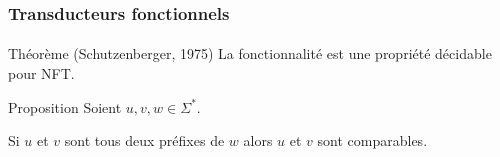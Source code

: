 \frametitle{Transducteurs fonctionnels}
\framesubtitle{}
	
\begin{block}{Théorème (Schutzenberger, 1975)}
	La fonctionnalité est une propriété décidable pour NFT.
\end{block}

\begin{block}{Proposition}
	Soient $u,v,w \in \Sigma^*$.
	
	Si $u$ et $v$ sont tous deux préfixes de $w$ alors $u$ et $v$ sont comparables.
\end{block}